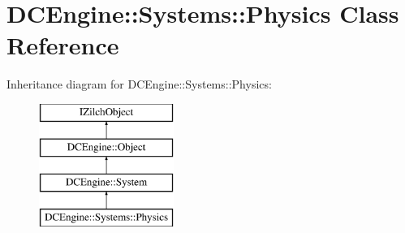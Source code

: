 \hypertarget{classDCEngine_1_1Systems_1_1Physics}{\section{D\-C\-Engine\-:\-:Systems\-:\-:Physics Class Reference}
\label{classDCEngine_1_1Systems_1_1Physics}
}
Inheritance diagram for D\-C\-Engine\-:\-:Systems\-:\-:Physics\-:\begin{figure}[H]
\begin{center}
\leavevmode
\includegraphics[height=4.000000cm]{classDCEngine_1_1Systems_1_1Physics}
\end{center}
\end{figure}
